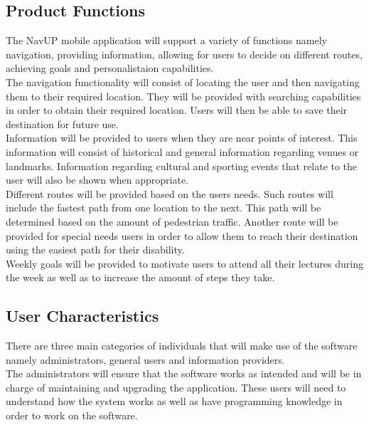 \documentclass[12pt,a4paper]{report}
\begin{document}
	\subsection*{Product Functions}
	The NavUP mobile application will support a variety of functions namely navigation, providing information, allowing for users to decide on different routes, achieving goals and personalistaion capabilities.
\\

The navigation functionality will consist of locating the user and then navigating them to their required location. They will be provided with searching capabilities in order to obtain their required location. Users will then be able to save their destination for future use.
\\

Information will be provided to users when they are near points of interest. This information will consist of historical and general information regarding venues or landmarks. Information regarding cultural and sporting events that relate to the user will also be shown when appropriate.
\\

Different routes will be provided based on the users needs. Such routes will include the fastest path from one location to the next. This path will be determined based on the amount of pedestrian traffic. Another route will be provided for special needs users in order to allow them to reach their destination using the easiest path for their disability. 
\\

Weekly goals will be provided to motivate users to attend all their lectures during the week as well as to increase the amount of steps they take.

\subsection*{User Characteristics}
There are three main categories of individuals that will make use of the software namely administrators, general users and information providers.
	\\		

		
	The administrators will ensure that the software works as intended and will be in charge of maintaining and upgrading the application. These users will need to understand how the system works as well as have programming knowledge in order to work on the software.  
	\\
\end{document}
